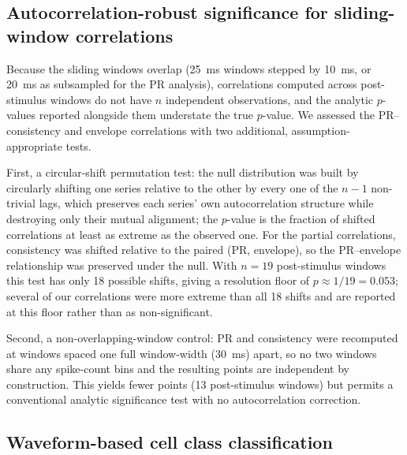 \documentclass[11pt,onecolumn]{article}
\begin{document}
\subsection{Autocorrelation-robust significance for sliding-window correlations}

Because the sliding windows overlap (25~ms windows stepped by 10~ms, or
20~ms as subsampled for the PR analysis), correlations computed across
post-stimulus windows do not have $n$ independent observations, and the
analytic $p$-values reported alongside them understate the true
$p$-value.  We assessed the PR--consistency and envelope correlations
with two additional, assumption-appropriate tests.

First, a circular-shift permutation test: the null distribution was built
by circularly shifting one series relative to the other by every one of
the $n-1$ non-trivial lags, which preserves each series' own
autocorrelation structure while destroying only their mutual alignment;
the $p$-value is the fraction of shifted correlations at least as extreme
as the observed one.  For the partial correlations, consistency was
shifted relative to the paired (PR, envelope), so the PR--envelope
relationship was preserved under the null.  With $n = 19$ post-stimulus
windows this test has only 18 possible shifts, giving a resolution floor
of $p \approx 1/19 = 0.053$; several of our correlations were more
extreme than all 18 shifts and are reported at this floor rather than as
non-significant.

Second, a non-overlapping-window control: PR and consistency were
recomputed at windows spaced one full window-width (30~ms) apart, so no
two windows share any spike-count bins and the resulting points are
independent by construction.  This yields fewer points (13 post-stimulus
windows) but permits a conventional analytic significance test with no
autocorrelation correction.

\subsection{Waveform-based cell class classification}
\end{document}
